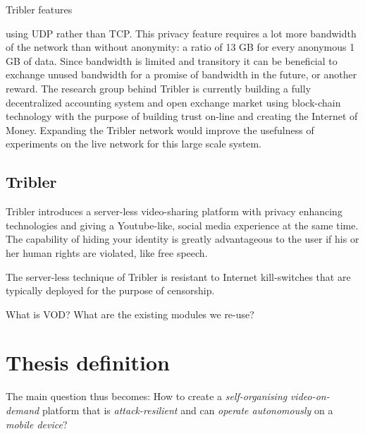 Tribler features


using UDP rather than TCP.
This privacy feature requires a lot more bandwidth of the network than without anonymity: a ratio of 13 GB for every anonymous 1 GB of data.
Since bandwidth is limited and transitory it can be beneficial to exchange unused bandwidth for a promise of bandwidth in the future, or another reward.
The research group behind Tribler is currently building a fully decentralized accounting system and open exchange market using block-chain technology with the purpose of building trust on-line and creating the Internet of Money.
Expanding the Tribler network would improve the usefulness of experiments on the live network for this large scale system.


\subsection{Tribler} %

Tribler introduces a server-less video-sharing platform with privacy enhancing technologies and giving a Youtube-like, social media experience at the same time.
The capability of hiding your identity is greatly advantageous to the user if his or her human rights are violated, like free speech.

The server-less technique of Tribler is resistant to Internet kill-switches that are typically deployed for the purpose of censorship.



What is VOD?
What are the existing modules we re-use?


\section{Thesis definition}
The main question thus becomes:
How to create a \emph{self-organising} \emph{video-on-demand} platform that is \emph{attack-resilient} and can \emph{operate autonomously} on a \emph{mobile device}?


